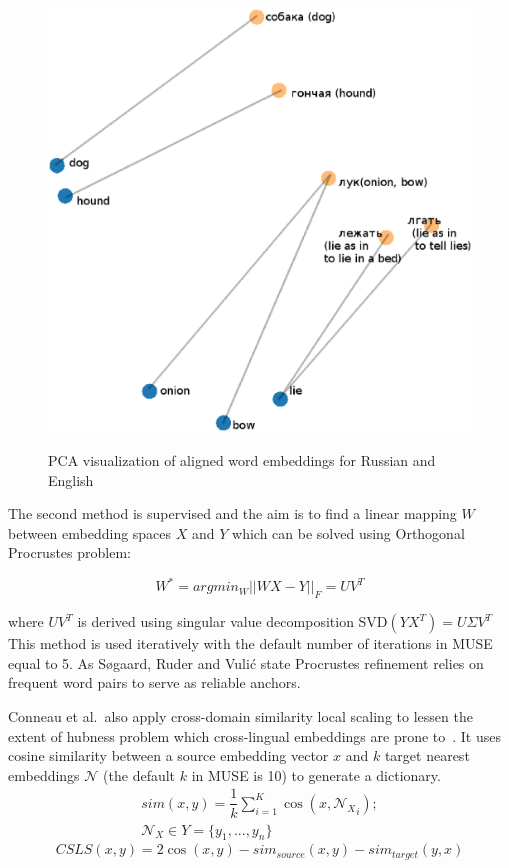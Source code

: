 \documentclass[11pt,a4paper]{article}
\begin{document}
\begin{figure}
	
	\centering
	\small
	\includegraphics[scale=0.3]{wordvectors}\\
	
	\caption{PCA visualization of aligned word embeddings for Russian and English}
	\label{wordvectors}
\end{figure}


The second method is supervised and the aim is to find a linear mapping $W$ between embedding spaces $X$ and $Y$ which can be solved using Orthogonal Procrustes problem:

$$ W^* = argmin_W ||WX - Y||_F = UV^T$$

where $UV^T$ is derived using singular value decomposition SVD$(YX^T) = U \Sigma V^T$
This method is used iteratively with the default number of iterations in MUSE equal to 5. As Søgaard, Ruder and Vulić state Procrustes refinement relies on frequent word pairs to serve as reliable anchors.

Conneau et al.\ also apply cross-domain similarity local scaling to lessen the extent of hubness problem which cross-lingual embeddings are prone to~\cite{dinu}. It uses cosine similarity between a source embedding vector $x$ and $k$ target nearest embeddings $\mathcal{N}$ (the default $k$ in MUSE is 10) to generate a dictionary.
\begin{align*}
sim(x, y) = \dfrac{1}{k}\sum_{i=1}^K\cos(x, {\mathcal{N}_X}_i);\\
\mathcal{N}_X \in Y=\{y_1,...,y_n\} 
\end{align*}
\small
$$CSLS(x,y) = 2\cos(x,y) - sim_{source}(x, y)  - sim_{target}(y, x)$$
\normalsize
\end{document}
